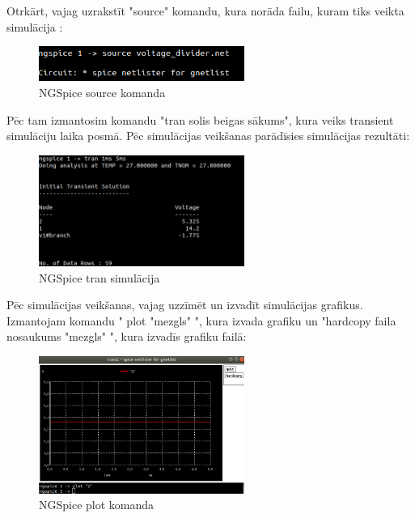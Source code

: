 \documentclass{article}
\begin{document}
        Otrkārt, vajag uzrakstīt "source" komandu, kura norāda failu, kuram tiks veikta simulācija :
        
        \begin{figure}[H]\centering\includegraphics[width=0.60\textwidth]{pictures/ngspice2.PNG}\caption{NGSpice source komanda}\label{picture:10lw7p}\end{figure}
        
        Pēc tam izmantosim komandu "tran solis beigas sākums", kura veiks transient simulāciju laika posmā. Pēc simulācijas veikšanas parādīsies simulācijas rezultāti:
        
        \begin{figure}[H]\centering\includegraphics[width=0.60\textwidth]{pictures/ngspice3.PNG}\caption{NGSpice tran simulācija}\label{picture:10lw8p}\end{figure}
        
        Pēc simulācijas veikšanas, vajag uzzīmēt un izvadīt simulācijas grafikus. Izmantojam komandu " plot "mezgls" ", kura izvada grafiku un "hardcopy faila nosaukums "mezgls" ", kura izvadīs grafiku failā:
        
        \begin{figure}[H]\centering\includegraphics[width=0.60\textwidth]{pictures/ngspice4.PNG}\caption{NGSpice plot komanda}\label{picture:10lw9p}\end{figure}
        
\end{document}
